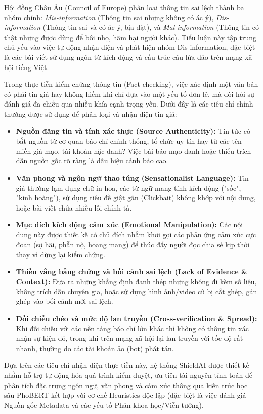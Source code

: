 \documentclass[12pt,a4paper]{article}
\begin{document}
Hội đồng Châu Âu (Council of Europe) phân loại thông tin sai lệch thành ba nhóm chính: \textit{Mis-information} (Thông tin sai nhưng không có ác ý), \textit{Dis-information} (Thông tin sai và có ác ý, bịa đặt), và \textit{Mal-information} (Thông tin có thật nhưng được dùng để bôi nhọ, hãm hại người khác). Tiểu luận này tập trung chủ yếu vào việc tự động nhận diện và phát hiện nhóm Dis-information, đặc biệt là các bài viết sử dụng ngôn từ kích động và cấu trúc câu lừa đảo trên mạng xã hội tiếng Việt.

Trong thực tiễn kiểm chứng thông tin (Fact-checking), việc xác định một văn bản có phải tin giả hay không hiếm khi chỉ dựa vào một yếu tố đơn lẻ, mà đòi hỏi sự đánh giá đa chiều qua nhiều khía cạnh trọng yếu. Dưới đây là các tiêu chí chính thường được sử dụng để phân loại và nhận diện tin giả:
\begin{itemize}[label={--},leftmargin=0.75cm,itemsep=3pt]
\item \textbf{Nguồn đăng tin và tính xác thực (Source Authenticity):} Tin tức có bắt nguồn từ cơ quan báo chí chính thống, tổ chức uy tín hay từ các tên miền giả mạo, tài khoản nặc danh? Việc bài báo mạo danh hoặc thiếu trích dẫn nguồn gốc rõ ràng là dấu hiệu cảnh báo cao.
\item \textbf{Văn phong và ngôn ngữ thao túng (Sensationalist Language):} Tin giả thường lạm dụng chữ in hoa, các từ ngữ mang tính kích động ("sốc", "kinh hoàng"), sử dụng tiêu đề giật gân (Clickbait) không khớp với nội dung, hoặc bài viết chứa nhiều lỗi chính tả.
\item \textbf{Mục đích kích động cảm xúc (Emotional Manipulation):} Các nội dung này được thiết kế có chủ đích nhằm khơi gợi các phản ứng cảm xúc cực đoan (sợ hãi, phẫn nộ, hoang mang) để thúc đẩy người đọc chia sẻ kịp thời thay vì dừng lại kiểm chứng.
\item \textbf{Thiếu vắng bằng chứng và bối cảnh sai lệch (Lack of Evidence \& Context):} Đưa ra những khẳng định đanh thép nhưng không đi kèm số liệu, không trích dẫn chuyên gia, hoặc sử dụng hình ảnh/video cũ bị cắt ghép, gán ghép vào bối cảnh mới sai lệch.
\item \textbf{Đối chiếu chéo và mức độ lan truyền (Cross-verification \& Spread):} Khi đối chiếu với các nền tảng báo chí lớn khác thì không có thông tin xác nhận sự kiện đó, trong khi trên mạng xã hội lại lan truyền với tốc độ rất nhanh, thường do các tài khoản ảo (bot) phát tán.
\end{itemize}

Dựa trên các tiêu chí nhận diện thực tiễn này, hệ thống ShieldAI được thiết kế nhằm hỗ trợ tự động hóa quá trình kiểm duyệt, ưu tiên tài nguyên tính toán để phân tích đặc trưng ngôn ngữ, văn phong và cảm xúc thông qua kiến trúc học sâu PhoBERT kết hợp với cơ chế Heuristics độc lập (đặc biệt là việc đánh giá Nguồn gốc Metadata và các yếu tố Phản khoa học/Viễn tưởng).
\end{document}
